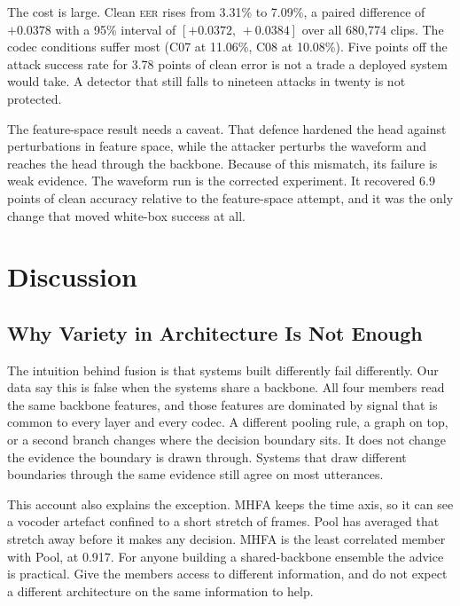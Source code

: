 \documentclass[twocolumn,a4paper,11pt]{article}
\newcommand{\eer}{\textsc{eer}}
\begin{document}
The cost is large. Clean \eer{} rises from 3.31\% to 7.09\%, a paired
difference of $+0.0378$ with a 95\% interval of $[+0.0372,\,+0.0384]$ over all
680{,}774 clips. The codec conditions suffer most (C07 at 11.06\%, C08 at
10.08\%). Five points off the attack success rate for 3.78 points of clean
error is not a trade a deployed system would take. A detector that still falls
to nineteen attacks in twenty is not protected.

The feature-space result needs a caveat. That defence hardened the head
against perturbations in feature space, while the attacker perturbs the
waveform and reaches the head through the backbone. Because of this mismatch,
its failure is weak evidence. The waveform run is the corrected experiment.
It recovered 6.9 points of clean accuracy relative to the feature-space
attempt, and it was the only change that moved white-box success at all.

\section{Discussion}
\label{sec:discussion}

\subsection{Why Variety in Architecture Is Not Enough}

The intuition behind fusion is that systems built differently fail
differently. Our data say this is false when the systems share a backbone. All
four members read the same backbone features, and those features are dominated
by signal that is common to every layer and every codec. A different pooling
rule, a graph on top, or a second branch changes where the decision boundary
sits. It does not change the evidence the boundary is drawn through. Systems
that draw different boundaries through the same evidence still agree on most
utterances.

This account also explains the exception. MHFA keeps the time axis, so it can
see a vocoder artefact confined to a short stretch of frames. Pool has averaged
that stretch away before it makes any decision. MHFA is the least correlated
member with Pool, at 0.917. For anyone building a shared-backbone ensemble the
advice is practical. Give the members access to different information, and do
not expect a different architecture on the same information to help.
\end{document}

